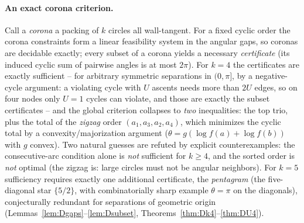 \documentclass[11pt]{article}
\theoremstyle{definition}
\begin{document}
\paragraph{An exact corona criterion.}
Call a \emph{corona} a packing of $k$ circles all wall-tangent. For a fixed
cyclic order the corona constraints form a linear feasibility system in the
angular gaps, so coronas are decidable exactly; every subset of a corona
yields a necessary \emph{certificate} (its induced cyclic sum of pairwise
angles is at most $2\pi$). For $k=4$ the certificates are exactly sufficient
-- for arbitrary symmetric separations in $(0,\pi]$, by a negative-cycle
argument: a violating cycle with $U$ ascents needs more than $2U$ edges, so
on four nodes only $U=1$ cycles can violate, and those are exactly the
subset certificates -- and the global criterion collapses to \emph{two}
inequalities: the top trio, plus the total of the \emph{zigzag} order
$(a_1,a_3,a_2,a_4)$, which minimizes the cyclic total by a
convexity/majorization argument ($\theta=g(\log f(a)+\log f(b))$ with $g$
convex). Two natural guesses are refuted by explicit counterexamples: the
consecutive-arc condition alone is \emph{not} sufficient for $k\ge4$, and the
sorted order is \emph{not} optimal (the zigzag is: large circles must not be
angular neighbors). For $k=5$ sufficiency requires exactly one additional
certificate, the \emph{pentagram} (the five-diagonal star $\{5/2\}$, with
combinatorially sharp example $\theta=\pi$ on the diagonals), conjecturally
redundant for separations of geometric origin
(Lemmas~\ref{lem:Dgaps}--\ref{lem:Dsubset},
Theorems~\ref{thm:Dk4}--\ref{thm:DU4}).
\end{document}
